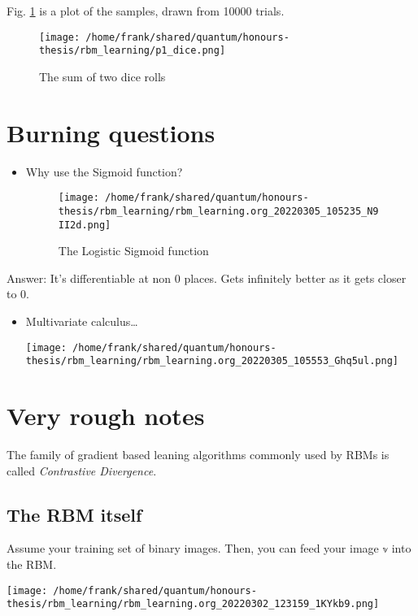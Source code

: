 \documentclass[11pt]{article}
\begin{document}
Fig. \ref{fig:p1-dice} is a plot of the samples, drawn from 10000 trials.




\begin{figure}[htbp]
\centering
\texttt{[image: /home/frank/shared/quantum/honours-thesis/rbm\_learning/p1\_dice.png]}
\caption{\label{fig:p1-dice}The sum of two dice rolls}
\end{figure}


\section{Burning questions}
\label{sec:orge2c6c1a}
\begin{itemize}
\item Why use the Sigmoid function?
\begin{figure}[htbp]
\centering
\texttt{[image: /home/frank/shared/quantum/honours-thesis/rbm\_learning/rbm\_learning.org\_20220305\_105235\_N9II2d.png]}
\caption{The Logistic Sigmoid function}
\end{figure}
\end{itemize}

Answer: It's differentiable at non 0 places. Gets infinitely better as it gets closer to 0.

\begin{itemize}
\item Multivariate calculus\ldots{}
\begin{center}
\texttt{[image: /home/frank/shared/quantum/honours-thesis/rbm\_learning/rbm\_learning.org\_20220305\_105553\_Ghq5ul.png]}
\end{center}
\end{itemize}

\section{Very rough notes}
\label{sec:org5e55b46}
The family of gradient based leaning algorithms commonly used by RBMs is called \emph{Contrastive Divergence}.

\subsection{The RBM itself}
\label{sec:orgfcdf7b8}
Assume your training set of binary images. Then, you can feed your image \(\mathbb{v}\) into the RBM.

\begin{center}
\texttt{[image: /home/frank/shared/quantum/honours-thesis/rbm\_learning/rbm\_learning.org\_20220302\_123159\_1KYkb9.png]}
\end{center}
\end{document}
